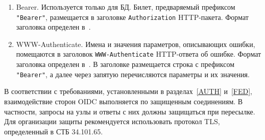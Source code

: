 \begin{enumerate}
\item
Bearer.
Используется только для БД.
%
Билет, предваряемый префиксом \lstinline{"Bearer"}, 
размещается в заголовке \lstinline{Authorization} HTTP-пакета.
%
Формат заголовка определен в~\cite{RFC6750}.

\item
WWW-Authenticate.
Имена и значения параметров, описывающих ошибки, помещаются в заголовок 
\lstinline{WWW-Authenticate} HTTP-ответа об ошибке. 
%
Формат заголовка определен в~\cite{RFC6750}.
%
В заголовке размещается строка с префиксом \lstinline{"Bearer"}, 
а далее через запятую перечисляются параметры и их значения.
\end{enumerate}

В соответствии с требованиями, установленными в разделах~\ref{AUTH} 
и~\ref{FED}, взаимодействие сторон OIDC выполняется по защищенным 
соединениям. В частности, запросы на узлы и ответы с них должны защищаться при 
пересылке. Для организации защиты рекомендуется использовать протокол TLS,
определенный в СТБ 34.101.65.
%
%

